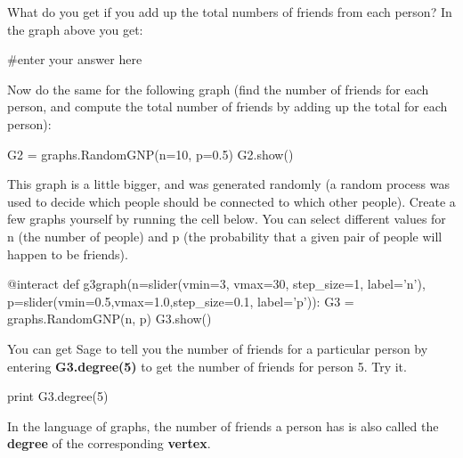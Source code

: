What do you get if you add up the total numbers of friends from each person? In
the graph above you get:

\begin{sageverbatim}
#enter your answer here

\end{sageverbatim}

Now do the same for the following graph (find the number of friends
for each person, and compute the total number of friends by adding up
the total for each person):
\begin{sageverbatim}
G2 = graphs.RandomGNP(n=10, p=0.5)
G2.show()
\end{sageverbatim}

This graph is a little bigger, and was generated randomly (a random
process was used to decide which people should be connected to which
other people).  Create a few graphs yourself by running the cell
below.  You can select different values for n (the number of people)
and p (the probability that a given pair of people will happen to be
friends).

\begin{sageverbatim}
@interact
def g3graph(n=slider(vmin=3, vmax=30, step_size=1, label='n'), p=slider(vmin=0.5,vmax=1.0,step_size=0.1, label='p')):
    G3 = graphs.RandomGNP(n, p)
    G3.show()
\end{sageverbatim}

You can get Sage to tell you the number of friends for a particular person by entering \textbf{G3.degree(5)}
to get the number of friends for person 5.  Try it.

\begin{sageverbatim}
print G3.degree(5)
\end{sageverbatim}




In the language of graphs, the number of friends a person has is also
called the \textbf{degree} of the corresponding \textbf{vertex}.












